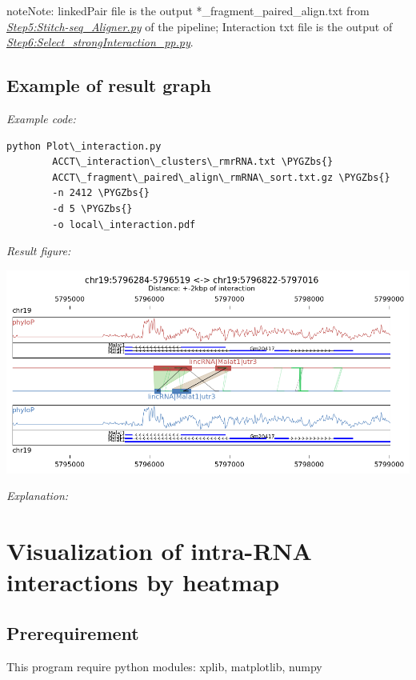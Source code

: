 \documentclass[letterpaper,10pt,english]{sphinxmanual}
\def\PYGZbs{\char`\\}
\begin{document}
\begin{notice}{note}{Note:}
linkedPair file is the output *\_fragment\_paired\_align.txt from {\hyperref[Analysis_pipeline:step5]{\emph{Step5:Stitch-seq\_Aligner.py}}} of the pipeline; Interaction txt file is the output of {\hyperref[Analysis_pipeline:step6]{\emph{Step6:Select\_strongInteraction\_pp.py}}}.
\end{notice}


\section{Example of result graph}
\label{Visualization:example-of-result-graph}
\emph{Example code:}

\begin{Verbatim}[commandchars=\\\{\}]
python Plot\_interaction.py
        ACCT\_interaction\_clusters\_rmrRNA.txt \PYGZbs{}
        ACCT\_fragment\_paired\_align\_rmRNA\_sort.txt.gz \PYGZbs{}
        -n 2412 \PYGZbs{}
        -d 5 \PYGZbs{}
        -o local\_interaction.pdf
\end{Verbatim}

\emph{Result figure:}

\includegraphics{local_interaction_malat1_ACCT.jpg}

\emph{Explanation:}


\chapter{Visualization of intra-RNA interactions by heatmap}
\label{Visualization:visualizationheatmap}\label{Visualization:visualization-of-intra-rna-interactions-by-heatmap}

\section{Prerequirement}
\label{Visualization:id1}
This program require python modules: xplib, matplotlib, numpy
\end{document}
